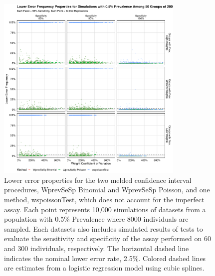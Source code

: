 \documentclass[AMA,STIX1COL]{WileyNJD-v2}
\begin{document}
\begin{figure}
\centering
\includegraphics[width=0.8\textwidth]{figures/imperfect_lower_error_frequency_50_groups_0_005_prev.pdf}
\caption{Lower error properties for the two melded confidence interval procedures, WprevSeSp Binomial and WprevSeSp Poisson, and one method, wspoissonTest, which does not account for the imperfect assay.
Each point represents 10,000 simulations of datasets from a population with 0.5\% Prevalence where 8000 individuals are sampled.
Each datasets also includes simulated results of tests to evaluate the sensitivity and specificity of the assay performed on 60 and 300 individuals, respectively.
The horizontal dashed line indicates the nominal lower error rate, 2.5\%.
Colored dashed lines are estimates from a logistic regression model using cubic splines.}
\label{fig:imperfect_lower_error_frequency_50_groups_0_005_prev}
\end{figure}
\end{document}
